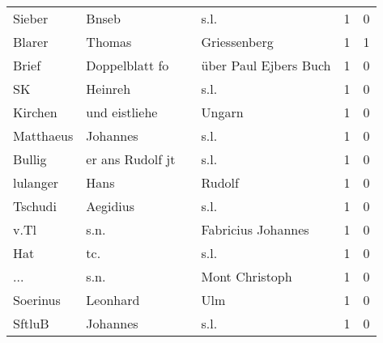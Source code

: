 \begin{center}
\begin{tiny}
\begin{longtabu}{llllrr}
                   Sieber &                              Bnseb &             &                                        s.l. &          1 &         0 \\
                   Blarer &                             Thomas &             &                                Griessenberg &          1 &         1 \\
                    Brief &                     Doppelblatt fo &             &                       über Paul Ejbers Buch &          1 &         0 \\
                       SK &                            Heinreh &             &                                        s.l. &          1 &         0 \\
                  Kirchen &                      und eistliehe &             &                                      Ungarn &          1 &         0 \\
                Matthaeus &                           Johannes &             &                                        s.l. &          1 &         0 \\
                   Bullig &                   er ans Rudolf jt &             &                                        s.l. &          1 &         0 \\
                 lulanger &                               Hans &             &                                      Rudolf &          1 &         0 \\
                  Tschudi &                           Aegidius &             &                                        s.l. &          1 &         0 \\
                     v.Tl &                               s.n. &             &                          Fabricius Johannes &          1 &         0 \\
                      Hat &                                tc. &             &                                        s.l. &          1 &         0 \\
                      ... &                               s.n. &             &                              Mont Christoph &          1 &         0 \\
                 Soerinus &                           Leonhard &             &                                         Ulm &          1 &         0 \\
                   SftluB &                           Johannes &             &                                        s.l. &          1 &         0 \\

\end{longtabu}
\end{tiny}
\end{center}
